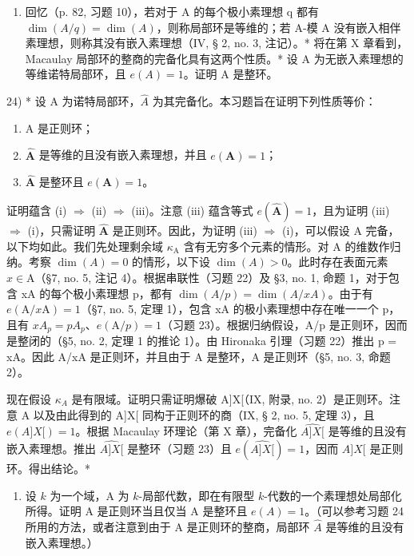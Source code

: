 \begin{enumerate}
\def\labelenumi{\alph{enumi})}
\setcounter{enumi}{1}
\tightlist
\item
  回忆（p. 82, 习题 10），若对于 A 的每个极小素理想 q 都有 \(\dim(A/q) = \dim(A)\)，则称局部环是等维的；若 A-模 A 没有嵌入相伴素理想，则称其没有嵌入素理想（IV, § 2, no. 3, 注记）。* 将在第 X 章看到，Macaulay 局部环的整商的完备化具有这两个性质。* 设 A 为无嵌入素理想的等维诺特局部环，且 \(e(A) = 1\)。证明 A 是整环。
\end{enumerate}

24) * 设 A 为诺特局部环，\(\widehat{A}\) 为其完备化。本习题旨在证明下列性质等价：

\begin{enumerate}
\def\labelenumi{(\roman{enumi})}
\item
  A 是正则环；
\item
  \(\hat{\mathbf{A}}\) 是等维的且没有嵌入素理想，并且 \(e(\mathbf{A}) = 1\)；
\item
  \(\hat{\mathbf{A}}\) 是整环且 \(e(\mathbf{A}) = 1\)。
\end{enumerate}

证明蕴含 (i) \(\Rightarrow\) (ii) \(\Rightarrow\) (iii)。注意 (iii) 蕴含等式 \(e(\hat{\mathbf{A}}) = 1\)，且为证明 (iii) \(\Rightarrow\) (i)，只需证明 \(\hat{\mathbf{A}}\) 是正则环。因此，为证明 (iii) \(\Rightarrow\) (i)，可以假设 A 完备，以下均如此。我们先处理剩余域 \(\kappa_{\mathrm{A}}\) 含有无穷多个元素的情形。对 A 的维数作归纳。考察 \(\dim(A) = 0\) 的情形，以下设 \(\dim(A) > 0\)。此时存在表面元素 \(x \in \mathrm{A}\)（\S 7, no. 5, 注记 4）。根据串联性（习题 22）及 \S 3, no. 1, 命题 1，对于包含 xA 的每个极小素理想 p，都有 \(\dim(A/p) = \dim(A/xA)\)。由于有 \(e(\mathrm{A}/x\mathrm{A}) = 1\)（\S 7, no. 5, 定理 1），包含 xA 的极小素理想中存在唯一一个 p，且有 \(xA_{p} = pA_{p}\)、\(e(\mathrm{A}/p) = 1\)（习题 23）。根据归纳假设，A/p 是正则环，因而是整闭的（\S 5, no. 2, 定理 1 的推论 1）。由 Hironaka 引理（习题 22）推出 p = xA。因此 A/xA 是正则环，并且由于 A 是整环，A 是正则环（\S 5, no. 3, 命题 2）。

现在假设 \(\kappa_{A}\) 是有限域。证明只需证明爆破 A{]}X{[}（IX, 附录, no. 2）是正则环。注意 A 以及由此得到的 A{]}X{[} 同构于正则环的商（IX, § 2, no. 5, 定理 3），且 \(e(A]X[)=1\)。根据 Macaulay 环理论（第 X 章），完备化 \(\widehat{A]X[}\) 是等维的且没有嵌入素理想。推出 \(\widehat{A]X[}\) 是整环（习题 23）且 \(e(\widehat{A]X[})=1\)，因而 \(A]X[\) 是正则环。得出结论。*

\begin{enumerate}
\def\labelenumi{\arabic{enumi})}
\setcounter{enumi}{24}
\tightlist
\item
  设 \(k\) 为一个域，A 为 \(k\)-局部代数，即在有限型 \(k\)-代数的一个素理想处局部化所得。证明 A 是正则环当且仅当 A 是整环且 \(e(A) = 1\)。（可以参考习题 24 所用的方法，或者注意到由于 A 是正则环的整商，局部环 \(\hat{A}\) 是等维的且没有嵌入素理想。）
\end{enumerate}

